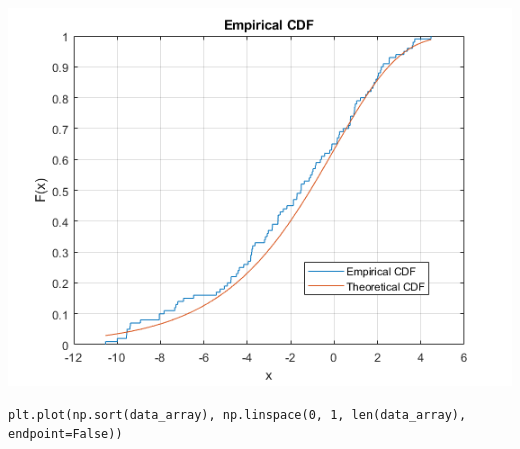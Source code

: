 \begin{center}
\includegraphics[scale=0.4]{CDF.png}
\end{center}

\lstset{language=Python}
\lstset{frame=lines}
\lstset{basicstyle=\footnotesize}
\begin{lstlisting}
plt.plot(np.sort(data_array), np.linspace(0, 1, len(data_array), endpoint=False))
\end{lstlisting}

\vspace{5mm}